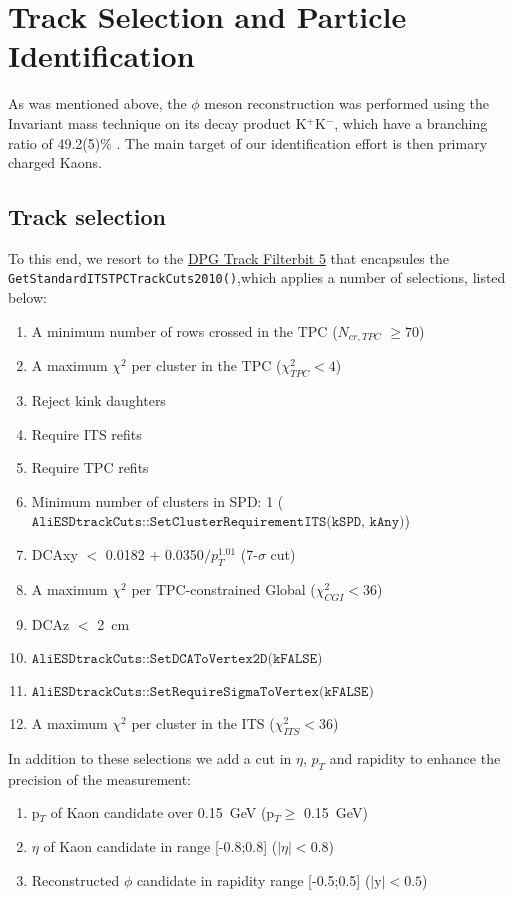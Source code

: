 \begin{comment}
TODO:	----------------------------
1. Add PID Histograms for each variation cut
2. PID shortcuts
------------------------------------------
\end{comment}

\section{Track Selection and Particle Identification}
\label{sec:Trackslelection}
As was mentioned above, the $\phi$ meson reconstruction was performed using the Invariant mass technique on its decay product K$^{+}$K$^{-}$, which have a branching ratio of 49.2(5)\% \cite{PDG}. The main target of our identification effort is then primary charged Kaons.\\
\subsection{Track selection}
To this end, we resort to the \href{https://twiki.cern.ch/twiki/bin/viewauth/ALICE/AliDPGtoolsFilteringCuts#Run_flag_1000_AddTrackCutsLHC10b}{DPG Track Filterbit 5} that encapsules the \texttt{GetStandardITSTPCTrackCuts2010()},which applies a number of selections, listed below:
\begin{enumerate}
\item A minimum number of rows crossed in the TPC ($N_{cr,TPC}$ $\geq 70$)
\item A maximum $\chi^2$ per cluster in the TPC ($\chi^2_{TPC} < 4$)
\item Reject kink daughters
\item Require ITS refits
\item Require TPC refits
\item Minimum number of clusters in SPD: 1 ($\texttt{AliESDtrackCuts::SetClusterRequirementITS(kSPD, kAny)}$)
\item DCAxy $<$ 0.0182 + 0.0350$/p_{T}^{1.01}$ (7-$\sigma$ cut)
\item A maximum $\chi^2$ per TPC-constrained Global ($\chi^2_{CGI} < 36$)
\item DCAz $<$ \SI{2}{\centi \meter}
\item $\texttt{AliESDtrackCuts::SetDCAToVertex2D(kFALSE)}$
\item $\texttt{AliESDtrackCuts::SetRequireSigmaToVertex(kFALSE)}$
\item A maximum $\chi^2$ per cluster in the ITS ($\chi^2_{ITS} < 36$)
\end{enumerate}
In addition to these selections we add a cut in $\eta$, $p_{T}$ and rapidity to enhance the precision of the measurement:
\begin{enumerate}
\item p$_{T}$ of Kaon candidate over \SI{0.15}{\giga\electronvolt} (p$_{T} \geq$ \SI{0.15}{\giga\electronvolt})
\item $\eta$ of Kaon candidate in range [-0.8;0.8] ($|\eta| < 0.8$)
\item Reconstructed $\phi$ candidate in rapidity range [-0.5;0.5] ($|\text{y}| < 0.5$)
\end{enumerate}
